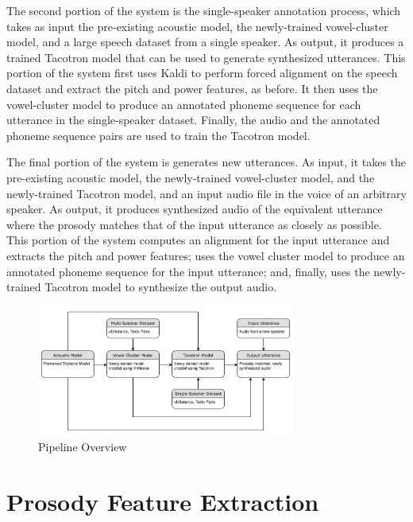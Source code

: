 \documentclass{article}
\begin{document}
The second portion of the system is the single-speaker annotation process, which takes as input the pre-existing acoustic model, the newly-trained vowel-cluster model, and a large speech dataset from a single speaker. As output, it produces a trained Tacotron model that can be used to generate synthesized utterances. This portion of the system first uses Kaldi to perform forced alignment on the speech dataset and extract the pitch and power features, as before. It then uses the vowel-cluster model to produce an annotated phoneme sequence for each utterance in the single-speaker dataset. Finally, the audio and the annotated phoneme sequence pairs are used to train the Tacotron model.

The final portion of the system is generates new utterances. As input, it takes the pre-existing acoustic model, the newly-trained vowel-cluster model, and the newly-trained Tacotron model, and an input audio file in the voice of an arbitrary speaker. As output, it produces synthesized audio of the equivalent utterance where the prosody matches that of the input utterance as closely as possible. This portion of the system computes an alignment for the input utterance and extracts the pitch and power features; uses the vowel cluster model to produce an annotated phoneme sequence for the input utterance; and, finally, uses the newly-trained Tacotron model to synthesize the output audio.

\begin{figure}[htb]

\begin{minipage}[b]{1.0\linewidth}
  \centering
  \centerline{\includegraphics[width=8.5cm]{Overall_Pipeline}}
\end{minipage}
\caption{Pipeline Overview}
\label{fig:overview}
\end{figure}

\section{Prosody Feature Extraction}
\label{sec:prosody}
\end{document}
